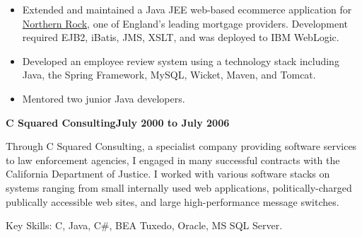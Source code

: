 \documentclass[a4paper,12pt]{article}
\newcommand{\jobheld}[2]{\textbf{#1\hfill #2}\nopagebreak}
\newcommand{\keyskills}[1]{\vspace{10pt}Key Skills: #1.}
\begin{document}
\begin{itemize}
\item Extended and maintained a Java JEE web-based ecommerce application for \href{http://www.northernrock.co.uk}{Northern Rock}, one of England's leading mortgage providers.  Development required EJB2, iBatis, JMS, XSLT, and was deployed to IBM WebLogic.

\item Developed an employee review system using a technology stack including Java, the Spring Framework, MySQL, Wicket, Maven, and Tomcat.

\item Mentored two junior Java developers.

\end{itemize}

\jobheld{C Squared Consulting}{July 2000 to July 2006}

Through C Squared Consulting, a specialist company providing software services to law enforcement agencies, I engaged in many successful contracts with the California Department of Justice.  I worked with various software stacks on systems ranging from small internally used web applications, politically-charged publically accessible web sites, and large high-performance message switches.

\keyskills{C, Java, C\#, BEA Tuxedo, Oracle, MS SQL Server}
\end{document}
